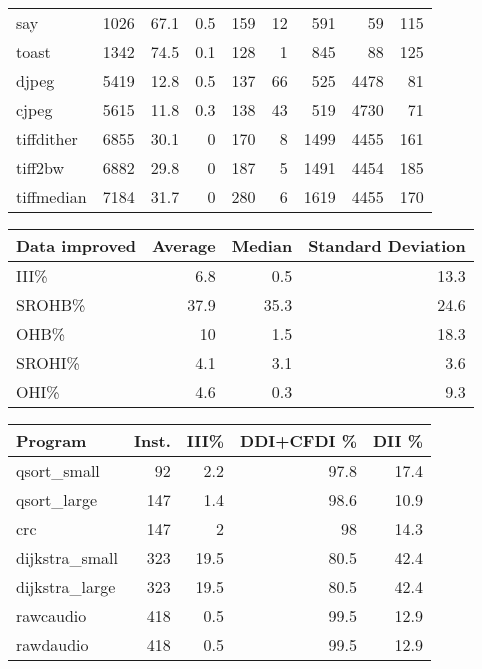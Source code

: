 \begin{tabular}{lrrrrrrrr}
 say             &     1026 &     67.1 &    0.5 &  159 &   12 &    591 &    59 &   115 \\
 toast           &     1342 &     74.5 &    0.1 &  128 &    1 &    845 &    88 &   125 \\
 djpeg           &     5419 &     12.8 &    0.5 &  137 &   66 &    525 &  4478 &    81 \\
 cjpeg           &     5615 &     11.8 &    0.3 &  138 &   43 &    519 &  4730 &    71 \\
 tiffdither      &     6855 &     30.1 &    0   &  170 &    8 &   1499 &  4455 &   161 \\
 tiff2bw         &     6882 &     29.8 &    0   &  187 &    5 &   1491 &  4454 &   185 \\
 tiffmedian      &     7184 &     31.7 &    0   &  280 &    6 &   1619 &  4455 &   170 \\
\hline
\end{tabular}\begin{tabular}{lrrr}
\hline
 Data improved   &   Average &   Median &   Standard Deviation \\
\hline
 III\%            &       6.8 &      0.5 &                 13.3 \\
 SROHB\%          &      37.9 &     35.3 &                 24.6 \\
 OHB\%            &      10   &      1.5 &                 18.3 \\
 SROHI\%          &       4.1 &      3.1 &                  3.6 \\
 OHI\%            &       4.6 &      0.3 &                  9.3 \\
\hline
\end{tabular}\begin{tabular}{lrrrr}
\hline
 Program         &   Inst. &   III\% &   DDI+CFDI \% &   DII \% \\
\hline
 qsort\_small     &      92 &    2.2 &         97.8 &    17.4 \\
 qsort\_large     &     147 &    1.4 &         98.6 &    10.9 \\
 crc             &     147 &    2   &         98   &    14.3 \\
 dijkstra\_small  &     323 &   19.5 &         80.5 &    42.4 \\
 dijkstra\_large  &     323 &   19.5 &         80.5 &    42.4 \\
 rawcaudio       &     418 &    0.5 &         99.5 &    12.9 \\
 rawdaudio       &     418 &    0.5 &         99.5 &    12.9 \\

\end{tabular}
